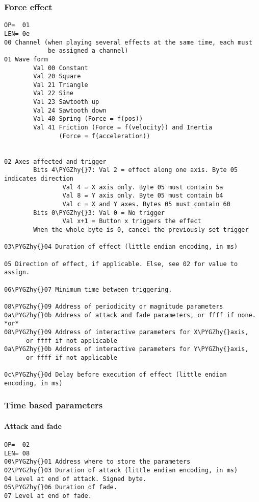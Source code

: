 \documentclass[a4paper,8pt,english]{sphinxmanual}
\def\PYGZhy{\char`\-}
\begin{document}
\subsubsection{Force effect}
\label{input/devices/iforce-protocol:force-effect}
\begin{Verbatim}[commandchars=\\\{\}]
OP=  01
LEN= 0e
00 Channel (when playing several effects at the same time, each must
            be assigned a channel)
01 Wave form
        Val 00 Constant
        Val 20 Square
        Val 21 Triangle
        Val 22 Sine
        Val 23 Sawtooth up
        Val 24 Sawtooth down
        Val 40 Spring (Force = f(pos))
        Val 41 Friction (Force = f(velocity)) and Inertia
               (Force = f(acceleration))


02 Axes affected and trigger
        Bits 4\PYGZhy{}7: Val 2 = effect along one axis. Byte 05 indicates direction
                Val 4 = X axis only. Byte 05 must contain 5a
                Val 8 = Y axis only. Byte 05 must contain b4
                Val c = X and Y axes. Bytes 05 must contain 60
        Bits 0\PYGZhy{}3: Val 0 = No trigger
                Val x+1 = Button x triggers the effect
        When the whole byte is 0, cancel the previously set trigger

03\PYGZhy{}04 Duration of effect (little endian encoding, in ms)

05 Direction of effect, if applicable. Else, see 02 for value to assign.

06\PYGZhy{}07 Minimum time between triggering.

08\PYGZhy{}09 Address of periodicity or magnitude parameters
0a\PYGZhy{}0b Address of attack and fade parameters, or ffff if none.
*or*
08\PYGZhy{}09 Address of interactive parameters for X\PYGZhy{}axis,
      or ffff if not applicable
0a\PYGZhy{}0b Address of interactive parameters for Y\PYGZhy{}axis,
      or ffff if not applicable

0c\PYGZhy{}0d Delay before execution of effect (little endian encoding, in ms)
\end{Verbatim}


\subsubsection{Time based parameters}
\label{input/devices/iforce-protocol:time-based-parameters}

\paragraph{Attack and fade}
\label{input/devices/iforce-protocol:attack-and-fade}
\begin{Verbatim}[commandchars=\\\{\}]
OP=  02
LEN= 08
00\PYGZhy{}01 Address where to store the parameters
02\PYGZhy{}03 Duration of attack (little endian encoding, in ms)
04 Level at end of attack. Signed byte.
05\PYGZhy{}06 Duration of fade.
07 Level at end of fade.
\end{Verbatim}
\end{document}
